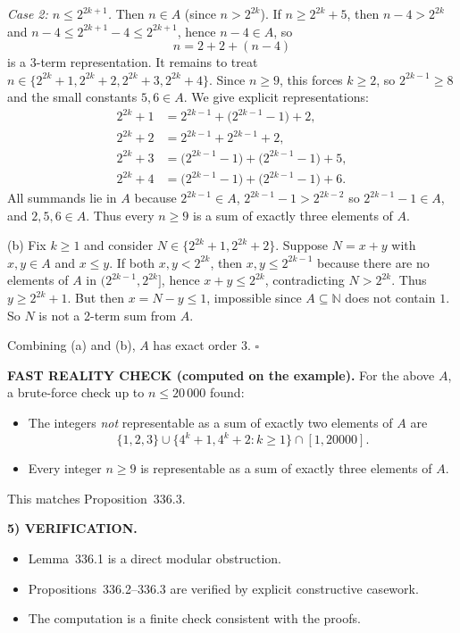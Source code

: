 \emph{Case 2: $n\le 2^{2k+1}$.}
Then $n\in A$ (since $n>2^{2k}$).
If $n\ge 2^{2k}+5$, then $n-4>2^{2k}$ and $n-4\le 2^{2k+1}-4\le 2^{2k+1}$, hence $n-4\in A$, so
\[
 n = 2+2+(n-4)
\]
is a 3-term representation.
It remains to treat $n\in\{2^{2k}+1,2^{2k}+2,2^{2k}+3,2^{2k}+4\}$.
Since $n\ge 9$, this forces $k\ge 2$, so $2^{2k-1}\ge 8$ and the small constants $5,6\in A$.
We give explicit representations:
\[
\begin{aligned}
2^{2k}+1 &= 2^{2k-1} + \bigl(2^{2k-1}-1\bigr) + 2,\\
2^{2k}+2 &= 2^{2k-1} + 2^{2k-1} + 2,\\
2^{2k}+3 &= \bigl(2^{2k-1}-1\bigr) + \bigl(2^{2k-1}-1\bigr) + 5,\\
2^{2k}+4 &= \bigl(2^{2k-1}-1\bigr) + \bigl(2^{2k-1}-1\bigr) + 6.
\end{aligned}
\]
All summands lie in $A$ because $2^{2k-1}\in A$, $2^{2k-1}-1>2^{2k-2}$ so $2^{2k-1}-1\in A$, and $2,5,6\in A$.
Thus every $n\ge 9$ is a sum of exactly three elements of $A$.

(b) Fix $k\ge 1$ and consider $N\in\{2^{2k}+1,2^{2k}+2\}$. Suppose $N=x+y$ with $x,y\in A$ and $x\le y$.
If both $x,y<2^{2k}$, then $x,y\le 2^{2k-1}$ because there are no elements of $A$ in $(2^{2k-1},2^{2k}]$, hence $x+y\le 2^{2k}$, contradicting $N>2^{2k}$.
Thus $y\ge 2^{2k}+1$. But then $x=N-y\le 1$, impossible since $A\subseteq\mathbb{N}$ does not contain $1$.
So $N$ is not a 2-term sum from $A$.

Combining (a) and (b), $A$ has exact order $3$.
\hfill$\square$

\medskip
\noindent\textbf{FAST REALITY CHECK (computed on the example).}
For the above $A$, a brute-force check up to $n\le 20\,000$ found:
\begin{itemize}
\item The integers \emph{not} representable as a sum of exactly two elements of $A$ are
\[\{1,2,3\}\cup\{4^k+1,4^k+2: k\ge 1\}\cap[1,20000].\]
\item Every integer $n\ge 9$ is representable as a sum of exactly three elements of $A$.
\end{itemize}
This matches Proposition~336.3.

\medskip
\noindent\textbf{5) VERIFICATION.}
\begin{itemize}
\item Lemma~336.1 is a direct modular obstruction.
\item Propositions~336.2--336.3 are verified by explicit constructive casework.
\item The computation is a finite check consistent with the proofs.
\end{itemize}


